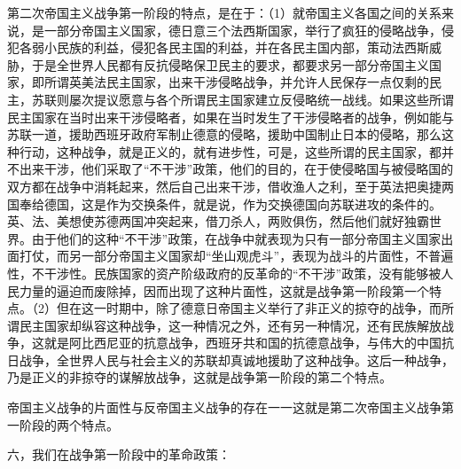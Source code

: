 第二次帝国主义战争第一阶段的特点，是在于：（1）就帝国主义各国之间的关系来说，是一部分帝国主义国家，德日意三个法西斯国家，举行了疯狂的侵略战争，侵犯各弱小民族的利益，侵犯各民主国的利益，并在各民主国内部，策动法西斯威胁，于是全世界人民都有反抗侵略保卫民主的要求，都要求另一部分帝国主义国家，即所谓英美法民主国家，出来干涉侵略战争，并允许人民保存一点仅剩的民主，苏联则屡次提议愿意与各个所谓民主国家建立反侵略统一战线。如果这些所谓民主国家在当时出来干涉侵略者，如果在当时发生了干涉侵略者的战争，例如能与苏联一道，援助西班牙政府军制止德意的侵略，援助中国制止日本的侵略，那么这种行动，这种战争，就是正义的，就有进步性，可是，这些所谓的民主国家，都并不出来干涉，他们采取了“不干涉”政策，他们的目的，在于使侵略国与被侵略国的双方都在战争中消耗起来，然后自己出来干涉，借收渔人之利，至于英法把奥捷两国奉给德国，这是作为交换条件，就是说，作为交换德国向苏联进攻的条件的。英、法、美想使苏德两国冲突起来，借刀杀人，两败俱伤，然后他们就好独霸世界。由于他们的这种“不干涉”政策，在战争中就表现为只有一部分帝国主义国家出面打仗，而另一部分帝国主义国家却“坐山观虎斗”，表现为战斗的片面性，不普遍性，不干涉性。民族国家的资产阶级政府的反革命的“不干涉”政策，没有能够被人民力量的逼迫而废除掉，因而出现了这种片面性，这就是战争第一阶段第一个特点。（2）但在这一时期中，除了德意日帝国主义举行了非正义的掠夺的战争，而所谓民主国家却纵容这种战争，这一种情况之外，还有另一种情况，还有民族解放战争，这就是阿比西尼亚的抗意战争，西班牙共和国的抗德意战争，与伟大的中国抗日战争，全世界人民与社会主义的苏联却真诚地援助了这种战争。这后一种战争，乃是正义的非掠夺的谋解放战争，这就是战争第一阶段的第二个特点。

帝国主义战争的片面性与反帝国主义战争的存在一一这就是第二次帝国主义战争第一阶段的两个特点。

六，我们在战争第一阶段中的革命政策：

